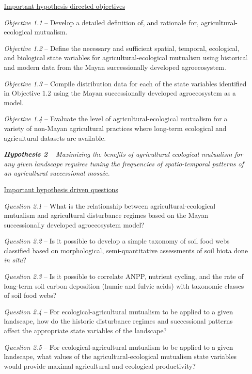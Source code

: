 \documentclass[twoside]{article}	%
\begin{document}
\begin{description}
	\underline{Important hypothesis directed objectives}
	\begin{description}
	\item{\textit{Objective 1.1} -- Develop a detailed definition of, and rationale for, agricultural-ecological mutualism.}
	\item{\textit{Objective 1.2} -- Define the necessary and sufficient spatial, temporal, ecological, and biological state variables for agricultural-ecological mutualism using historical and modern data from the Mayan successionally developed agroecosystem.}
	\item{\textit{Objective 1.3} -- Compile distribution data for each of the state variables identified in Objective 1.2 using the Mayan successionally developed agroecosystem as a model.}
	\item{\textit{Objective 1.4} -- Evaluate the level of agricultural-ecological mutualism for a variety of non-Mayan agricultural practices where long-term ecological and agricultural datasets are available.}	
	\end{description}
	
	
	\item{\textit{\textbf{Hypothesis 2} -- Maximizing the benefits of agricultural-ecological mutualism for any given landscape requires tuning the frequencies of spatio-temporal patterns of an agricultural successional mosaic.}}
	
	\underline{Important hypothesis driven questions}
	\begin{description}
		\item{\textit{Question 2.1} -- What is the relationship between agricultural-ecological mutualism and agricultural disturbance regimes based on the Mayan successionally developed agroecosystem model?}		
		\item{\textit{Question 2.2} -- Is it possible to develop a simple taxonomy of soil food webs classified based on morphological, semi-quantitative assessments of soil biota done \textit{in situ}?}
		\item{\textit{Question 2.3} -- Is it possible to correlate ANPP, nutrient cycling, and the rate of long-term soil carbon deposition (humic and fulvic acids) with taxonomic classes of soil food webs?}
		\item{\textit{Question 2.4} -- For ecological-agricultural mutualism to be applied to a given landscape, how do the historic disturbance regimes and successional patterns affect the appropriate state variables of the landscape?}
		\item{\textit{Question 2.5} -- For ecological-agricultural mutualism to be applied to a given landscape, what values of the agricultural-ecological mutualism state variables would provide maximal agricultural and ecological productivity?}
	\end{description}
	

\end{description}
\end{document}
